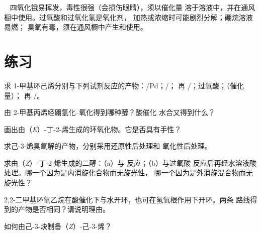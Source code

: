 \begin{safety}{\,\,\,}
四氧化锇易挥发，毒性很强（会损伤眼睛），须以催化量
溶于溶液中，并在通风橱中使用。过氧酸和过氧化氢是氧化剂，
加热或浓缩时可能剧烈分解；硼烷溶液易燃；
臭氧有毒，须在通风橱中产生和使用。
\end{safety}

\section{练习}

\begin{exercise}[$\star$]\label{exo:b2:alkene-redox:1}
求 1-甲基环己烯分别与下列试剂反应的产物：/Pd；/；
 再 /；过氧酸；（催化量）； 再
/。
\end{exercise}

\begin{exercise}[$\star$]\label{exo:b2:alkene-redox:2}
由 2-甲基丙烯经硼氢化–氧化得到哪种醇？酸催化
水合又得到什么？
\end{exercise}

\begin{exercise}[$\star$]\label{exo:b2:alkene-redox:3}
画出由（\textit{E}）-丁-2-烯生成的环氧化物。它是否具有手性？
\end{exercise}

\begin{exercise}[$\star$]\label{exo:b2:alkene-redox:4}
求己-3-烯臭氧解的产物，分别采用还原性后处理和
氧化性后处理。
\end{exercise}

\begin{exercise}[$\star\star$]\label{exo:b2:alkene-redox:5}
求由（\textit{Z}）-丁-2-烯生成的二醇：（a）与  反应；（b）与过氧酸
反应后再经水溶液酸处理。哪一个因为是内消旋化合物而无旋光性，
哪一个因为是外消旋混合物而无旋光性？
\end{exercise}

\begin{exercise}[$\star\star$]\label{exo:b2:alkene-redox:6}
2,2-二甲基环氧乙烷在酸催化下与水开环，也可在氢氧根作用下开环。两条
路线得到的产物是否相同？请说明理由。
\end{exercise}

\begin{exercise}[$\star\star$]\label{exo:b2:alkene-redox:7}
如何由己-3-炔制备（\textit{Z}）-己-3-烯？
\end{exercise}

